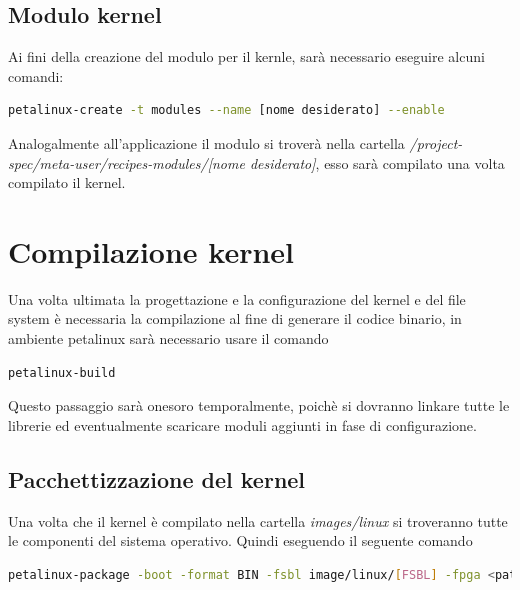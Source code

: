 \subsection{Modulo kernel}
Ai fini della creazione del modulo per il kernle, sarà necessario eseguire alcuni comandi:
\begin{lstlisting}[language=sh, label=lst:sh, caption={Comando necessario alla creazione del modulo kernel}]
petalinux-create -t modules --name [nome desiderato] --enable
\end{lstlisting}
Analogalmente all'applicazione il modulo si troverà nella cartella \textit{/project-spec/meta-user/recipes-modules/[nome desiderato]}, esso sarà compilato una volta compilato il kernel.

\section{Compilazione kernel}
Una volta ultimata la progettazione e la configurazione del kernel e del file system è necessaria la compilazione al fine di generare il codice binario, in ambiente petalinux sarà necessario usare il comando
\begin{lstlisting}[language=sh, label=lst:sh, caption={Comando necessario alla compilazione del kernel}]
petalinux-build
\end{lstlisting}
Questo passaggio sarà onesoro temporalmente, poichè si dovranno linkare tutte le librerie ed eventualmente scaricare moduli aggiunti in fase di configurazione.
\subsection{Pacchettizzazione del kernel}
Una volta che il kernel è compilato nella cartella \textit{images/linux} si troveranno tutte le componenti del sistema operativo. Quindi eseguendo il seguente comando
\begin{lstlisting}[language=sh, label=lst:sh, caption={Comando necessario alla pacchettizzazione del kernel}]
petalinux-package -boot -format BIN -fsbl image/linux/[FSBL] -fpga <path/to/bitstream> -u-boot
\end{lstlisting}
